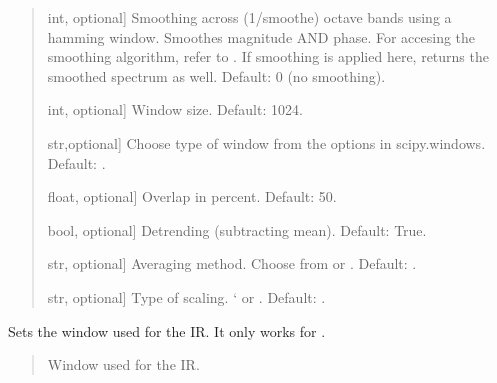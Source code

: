 \documentclass[letterpaper,10pt,english]{sphinxmanual}
\begin{document}
\begin{fulllineitems}
\begin{fulllineitems}
\begin{quote}
\begin{description}
\begin{description}
\sphinxlineitem{\sphinxstylestrong{smoothe}}{[}int, optional{]}
\sphinxAtStartPar
Smoothing across (1/smoothe) octave bands using a hamming
window. Smoothes magnitude AND phase. For accesing the smoothing
algorithm, refer to
.
If smoothing is applied here,  returns
the smoothed spectrum as well.
Default: 0 (no smoothing).

\sphinxlineitem{\sphinxstylestrong{window\_length\_samples}}{[}int, optional{]}
\sphinxAtStartPar
Window size. Default: 1024.

\sphinxlineitem{\sphinxstylestrong{window\_type}}{[}str,optional{]}
\sphinxAtStartPar
Choose type of window from the options in scipy.windows.
Default: .

\sphinxlineitem{\sphinxstylestrong{overlap\_percent}}{[}float, optional{]}
\sphinxAtStartPar
Overlap in percent. Default: 50.

\sphinxlineitem{\sphinxstylestrong{detrend}}{[}bool, optional{]}
\sphinxAtStartPar
Detrending (subtracting mean). Default: True.

\sphinxlineitem{\sphinxstylestrong{average}}{[}str, optional{]}
\sphinxAtStartPar
Averaging method. Choose from  or .
Default: .

\sphinxlineitem{\sphinxstylestrong{scaling}}{[}str, optional{]}
\sphinxAtStartPar
Type of scaling. ‘ or . Default: .

\end{description}

\end{description}\end{quote}

\end{fulllineitems}


\begin{fulllineitems}
\label{\detokenize{classes:dsptoolbox.classes.signal_class.Signal.set_window}}
\pysigstartsignatures
{}
\pysigstopsignatures
\sphinxAtStartPar
Sets the window used for the IR. It only works for
.
\begin{quote}\begin{description}
\begin{description}
\sphinxlineitem{\sphinxstylestrong{window}}{[}\sphinxtitleref{np.ndarray}{]}
\sphinxAtStartPar
Window used for the IR.


\end{description}
\end{description}
\end{quote}
\end{fulllineitems}
\end{fulllineitems}
\end{document}
